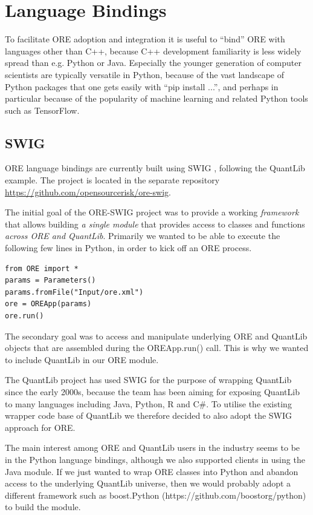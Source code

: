 \documentclass[12pt, a4paper]{report}
\begin{document}
\section{Language Bindings}

To facilitate ORE adoption and integration it is useful to ``bind'' ORE with languages other
than C++, because C++ development familiarity is less widely spread than e.g. Python or Java.
Especially the younger generation of computer scientists are typically versatile in Python,
because of the vast landscape of Python packages that one gets easily with ``pip install ...'',
and perhaps in particular because of the popularity of machine learning and related Python tools
such as TensorFlow.

\subsection*{SWIG}

ORE language bindings are currently built using SWIG \cite{swig}, following the QuantLib example. 
The project is located in the separate repository \url{https://github.com/opensourcerisk/ore-swig}.

The initial goal of the ORE-SWIG project was to provide a working {\em framework} that allows building
{\em a single module} that provides access to classes and functions {\em across ORE and QuantLib}.
Primarily we wanted to be able to execute the following few lines in Python, in order to kick
off an ORE process.

\begin{verbatim}
from ORE import *
params = Parameters()
params.fromFile("Input/ore.xml")
ore = OREApp(params)
ore.run()
\end{verbatim}

The secondary goal was to access and manipulate underlying ORE and QuantLib objects that are assembled
during the OREApp.run() call. This is why we wanted to include QuantLib in our ORE module.

The QuantLib project has used SWIG for the purpose of wrapping QuantLib since the early 2000s,
because the team has been aiming for exposing QuantLib to many languages including Java, Python,
R and C\#. To utilise the existing wrapper code base of QuantLib we therefore decided to also adopt
the SWIG approach for ORE.

The main interest among ORE and QuantLib users in the industry seems to be in the Python
language bindings, although we also supported clients in using the Java module.
If we just wanted to wrap ORE classes into Python and abandon access to the underlying
QuantLib universe, then we would probably adopt a different framework such as boost.Python
(https://github.com/boostorg/python) to build the module.
\end{document}
